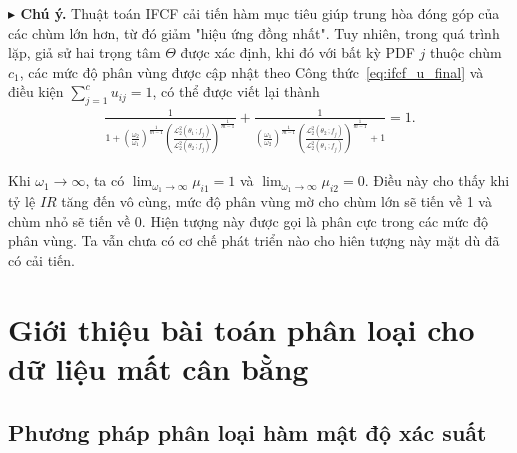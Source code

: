 \documentclass[a4paper,oneside]{book} %
\theoremstyle{plain}
\theoremstyle{plain}
\theoremstyle{nonumberplain}
\begin{document}
\textbf{$\blacktriangleright$ Chú ý.}
Thuật toán IFCF cải tiến hàm mục tiêu giúp trung hòa đóng góp của các chùm lớn hơn, từ đó giảm "hiệu ứng đồng nhất". Tuy nhiên, trong quá trình lặp, giả sử hai trọng tâm $\Theta$ được xác định, khi đó với bất kỳ PDF $j$ thuộc chùm $c_1$, các mức độ phân vùng được cập nhật theo Công thức~\eqref{eq:ifcf_u_final} và điều kiện $\sum_{j=1}^c u_{ij}=1$, có thể được viết lại thành
\begin{align*}
	\frac{1}{1 + \left(\frac{\omega_2}{\omega_1}\right)^{\frac{1}{m-1}}
		\left(\frac{\mathcal{L}^2_2(\theta_1\,;f_j)}{\mathcal{L}^2_2(\theta_2\,;f_j)}\right)^{\frac{1}{m-1}}}
	+
	\frac{1}{\left(\frac{\omega_1}{\omega_2}\right)^{\frac{1}{m-1}}
		\left(\frac{\mathcal{L}^2_2(\theta_2\,;f_j)}{\mathcal{L}^2_2(\theta_1\,;f_j)}\right)^{\frac{1}{m-1}}+1}
	= 1.
\end{align*}

Khi $\omega_1 \to \infty$, ta có $
\lim_{\omega_1 \to \infty} \mu_{i1} = 1$ và
$\lim_{\omega_1 \to \infty} \mu_{i2} = 0.$ Điều này cho thấy khi tỷ lệ  $IR$ tăng đến vô cùng, mức độ phân vùng mờ cho chùm lớn sẽ tiến về 1 và chùm nhỏ sẽ tiến về 0. Hiện tượng này được gọi là phân cực trong các mức độ phân vùng. Ta vẫn chưa có cơ chế phát triển nào cho hiên tượng này mặt dù đã có cải tiến.













\section{Giới thiệu bài toán phân loại cho dữ liệu mất cân bằng}



\subsection{Phương pháp phân loại hàm mật độ xác suất}
\end{document}
